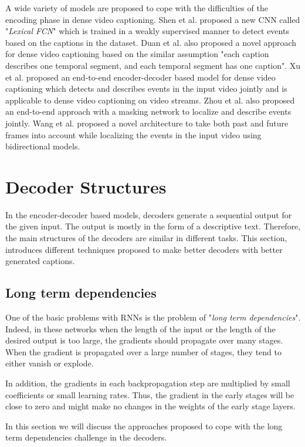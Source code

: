 \documentclass[preprint, 12pt]{elsarticle}
\begin{document}
		A wide variety of models are proposed to cope with the difficulties of the encoding phase in dense video captioning. Shen et al. \cite{shen2017weakly} proposed a new CNN called "\textit{Lexical FCN}" which is trained in a weakly supervised manner to detect events based on the captions in the dataset. Duan et al. also proposed a novel approach for dense video captioning based on the similar assumption "each caption describes one temporal segment, and each temporal segment has one caption"\cite{duan2018weakly}. Xu et al. proposed an end-to-end encoder-decoder based model for dense video captioning which detects and describes events in the input video jointly and is applicable to dense video captioning on video streams. Zhou et al. also proposed an end-to-end approach with a masking network to localize and describe events jointly\cite{zhou2018end}. Wang et al. proposed a novel architecture to take both past and future frames into account while localizing the events in the input video \cite{wang2018bidirectional} using bidirectional models. 
	
	\section{Decoder Structures}
	In the encoder-decoder based models, decoders generate a sequential output for the given input. The output is mostly in the form of a descriptive text. Therefore, the main structures of the decoders are similar in different tasks. This section, introduces different techniques proposed to make better decoders with better generated captions. 
		\subsection{Long term dependencies}
		One of the basic problems with RNNs is the problem of "\textit{long term dependencies}". Indeed, in these networks when the length of the input or the length of the desired output is too large, the gradients should propagate over many stages. When the gradient is propagated over a large number of stages, they tend to either vanish or explode.
		
		 In addition, the gradients in each backpropagation step are multiplied by small coefficients or small learning rates. Thus, the gradient in the early stages will be close to zero and might make no changes in the weights of the early stage layers\cite{goodfellow2016deep}. 
		
		In this section we will discuss the approaches proposed to cope with the long term dependencies challenge in the decoders.
		
\end{document}
